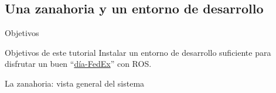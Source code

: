   \begin{frame}
    \tableofcontents[currentsection]
  \end{frame}

%
\subsection{Una zanahoria y un entorno de desarrollo}

  \begin{frame}{Objetivos}
    \begin{alertblock}{Objetivos de este tutorial}
      Instalar un entorno de desarrollo suficiente para disfrutar un buen ``\href{http://www.atlassian.com/fedex-day}{día-FedEx}'' con ROS.
    \end{alertblock}
    \begin{block}{La zanahoria: vista general del sistema}
      \begin{center}
      \end{center}
    \end{block}
  \end{frame}

